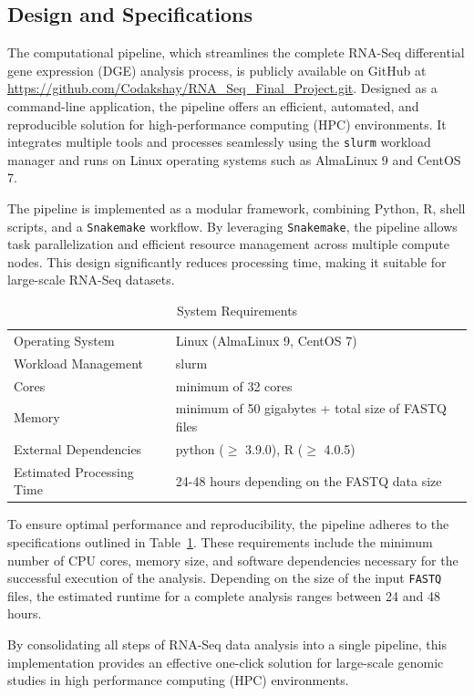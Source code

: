 \documentclass{article}
\begin{document}
\subsection{Design and Specifications}
The computational pipeline, which streamlines the complete RNA-Seq differential gene expression (DGE) analysis process, is publicly available on GitHub at \url{https://github.com/Codakshay/RNA_Seq_Final_Project.git}. Designed as a command-line application, the pipeline offers an efficient, automated, and reproducible solution for high-performance computing (HPC) environments. It integrates multiple tools and processes seamlessly using the \texttt{slurm} workload manager and runs on Linux operating systems such as AlmaLinux 9 and CentOS 7.

The pipeline is implemented as a modular framework, combining Python, R, shell scripts, and a \texttt{Snakemake} workflow. By leveraging \texttt{Snakemake}, the pipeline allows task parallelization and efficient resource management across multiple compute nodes. This design significantly reduces processing time, making it suitable for large-scale RNA-Seq datasets.
\begin{table}[H]
\renewcommand{\arraystretch}{1.2} %
\centering
\begin{tabular}{ll}
\toprule
Operating System & Linux (AlmaLinux 9, CentOS 7) \\
Workload Management & slurm \\
Cores & minimum of 32 cores \\
Memory & minimum of 50 gigabytes + total size of FASTQ files \\
External Dependencies & python ($\geq$ 3.9.0), R ($\geq$ 4.0.5) \\
Estimated Processing Time & 24-48 hours depending on the FASTQ data size \\
\bottomrule
\end{tabular}
\caption{System Requirements}
\label{tab:system_requirements}
\end{table}
To ensure optimal performance and reproducibility, the pipeline adheres to the specifications outlined in Table~\ref{tab:system_requirements}. These requirements include the minimum number of CPU cores, memory size, and software dependencies necessary for the successful execution of the analysis. Depending on the size of the input \texttt{FASTQ} files, the estimated runtime for a complete analysis ranges between 24 and 48 hours.

By consolidating all steps of RNA-Seq data analysis into a single pipeline, this implementation provides an effective one-click solution for large-scale genomic studies in high performance computing (HPC) environments.
\end{document}
